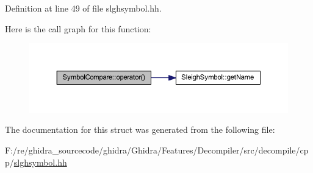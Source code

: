 Definition at line 49 of file slghsymbol.\+hh.

Here is the call graph for this function\+:
\nopagebreak
\begin{figure}[H]
\begin{center}
\leavevmode
\includegraphics[width=350pt]{struct_symbol_compare_ad7fc2167a71d2e6308213cbc2575c231_cgraph}
\end{center}
\end{figure}


The documentation for this struct was generated from the following file\+:\begin{DoxyCompactItemize}
\item 
F\+:/re/ghidra\+\_\+sourcecode/ghidra/\+Ghidra/\+Features/\+Decompiler/src/decompile/cpp/\mbox{\hyperlink{slghsymbol_8hh}{slghsymbol.\+hh}}\end{DoxyCompactItemize}
